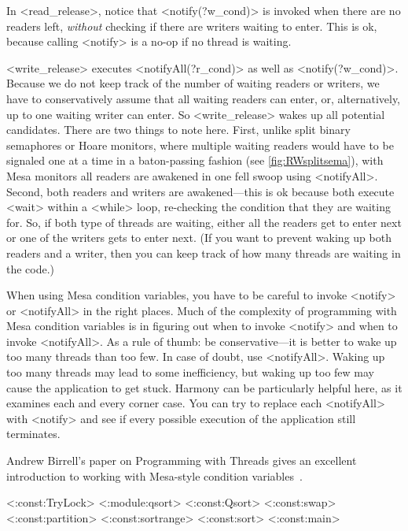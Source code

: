 \documentclass{report}
\begin{document}
In <{read_release}>, notice that <{notify(?w_cond)}>
is invoked when there are no readers left, \emph{without} checking
if there are writers waiting to enter.  This is
ok, because calling <{notify}> is a no-op if no thread is
waiting.

<{write_release}> executes <{notifyAll(?r_cond)}>
as well as <{notify(?w_cond)}>.  Because we
do not keep track of the number of waiting readers or writers, we
have to conservatively assume that all waiting readers can enter,
or, alternatively, up to one waiting writer can enter.  So
<{write_release}> wakes up all potential candidates.  There
are two things to note here.  First, unlike split binary semaphores
or Hoare monitors, where multiple waiting readers would have to be
signaled one at a time in a baton-passing fashion (see
\autoref{fig:RWsplitsema}), with Mesa monitors all readers are
awakened in one fell swoop using <{notifyAll}>.  Second, both
readers and writers are awakened---this is ok because both execute
<{wait}> within a <{while}> loop, re-checking the condition
that they are waiting for.  So, if both type of threads are waiting,
either all the readers get to enter next or one of the writers gets
to enter next.  (If you want to prevent waking up both readers and
a writer, then you can keep track of how many threads are waiting
in the code.)

When using Mesa condition variables, you have to be careful to invoke
<{notify}> or <{notifyAll}> in the right places.
Much of the complexity of programming with Mesa condition variables
is in figuring out when to invoke <{notify}> and when to invoke
<{notifyAll}>.  As a rule of thumb: be conservative---it is
better to wake up too many threads than too few.
In case of doubt, use <{notifyAll}>.
Waking up too
many threads may lead to some inefficiency, but waking up too few
may cause the application to get stuck.  Harmony can be particularly
helpful here, as it examines each and every corner case.
You can try to replace each <{notifyAll}> with <{notify}> and see
if every possible execution of the application still terminates.

Andrew Birrell's paper on Programming with Threads gives an excellent
introduction to working with Mesa-style condition variables~\cite{Birrell89}.

<{:const:TryLock}>
<{:module:qsort}>
<{:const:Qsort}>
<{:const:swap}>
<{:const:partition}>
<{:const:sortrange}>
<{:const:sort}>
<{:const:main}>
\end{document}
